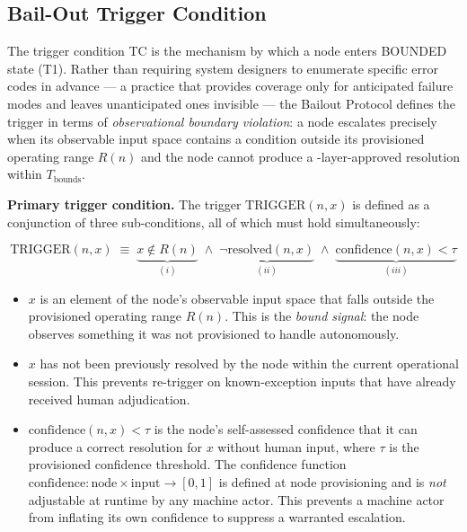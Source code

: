 \subsection{Bail-Out Trigger Condition}\label{sec:bailout-trigger}

The trigger condition TC is the mechanism by which a node enters BOUNDED state (T1). Rather than requiring system designers to enumerate specific error codes in advance — a practice that provides coverage only for anticipated failure modes and leaves unanticipated ones invisible — the Bailout Protocol defines the trigger in terms of \emph{observational boundary violation}: a node escalates precisely when its observable input space contains a condition outside its provisioned operating range $R(n)$ and the node cannot produce a \fact-layer-approved resolution within $T_{\text{bounds}}$.

\medskip\noindent\textbf{Primary trigger condition.} The trigger $\text{TRIGGER}(n, x)$ is defined as a conjunction of three sub-conditions, all of which must hold simultaneously:

\begin{equation}
\text{TRIGGER}(n, x) \;\equiv\; \underbrace{x \notin R(n)}_{(i)} \; \land\; \underbrace{\neg\text{resolved}(n, x)}_{(ii)} \; \land\; \underbrace{\text{confidence}(n, x) < \tau}_{(iii)} \tag{TC}
\end{equation}

\begin{itemize}\itemsep=0pt
\item[(i)] $x$ is an element of the node's observable input space that falls outside the provisioned operating range $R(n)$. This is the \emph{bound signal}: the node observes something it was not provisioned to handle autonomously.
\item[(ii)] $x$ has not been previously resolved by the node within the current operational session. This prevents re-trigger on known-exception inputs that have already received human adjudication.
\item[(iii)] $\text{confidence}(n, x) < \tau$ is the node's self-assessed confidence that it can produce a correct resolution for $x$ without human input, where $\tau$ is the provisioned confidence threshold. The confidence function $\text{confidence} : \text{node} \times \text{input} \rightarrow [0, 1]$ is defined at node provisioning and is \emph{not} adjustable at runtime by any machine actor. This prevents a machine actor from inflating its own confidence to suppress a warranted escalation.
\end{itemize}

